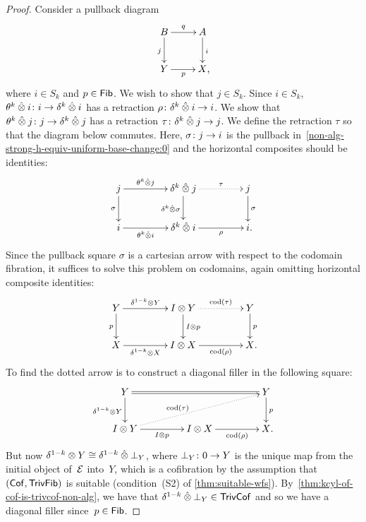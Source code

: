 \documentclass[reqno,10pt,a4paper,oneside,draft]{amsart}
\begin{document}
{{\begin{proof}
Consider a pullback diagram
\begin{equation} \label{non-alg-strong-h-equiv-uniform-base-change:0}
\begin{gathered}
\xymatrix{
 B \ar[d]_j \ar[r]^q & A \ar[d]^i \\
Y \ar[r]_p & X \rlap{,}}
\end{gathered}
\end{equation}
where $i  \in S_k$ and $p \in \mathsf{Fib}$.
We wish to show that $j \in  S_k$.
Since $i \in S_k$, $\theta^k \mathbin{\hat{\otimes}} i \colon i \to \delta^k \mathbin{\hat{\otimes}} i$ has a retraction $\rho \colon \delta^k \mathbin{\hat{\otimes}} i \to i$.
We show that $\theta^k \mathbin{\hat{\otimes}} j \colon j \to \delta^k \mathbin{\hat{\otimes}} j$ has a retraction $\tau \colon  \delta^k \mathbin{\hat{\otimes}} j \to j$.
We define the retraction $\tau$ so that the diagram below commutes.
Here, $\sigma \colon j \to i$ is the pullback in~\eqref{non-alg-strong-h-equiv-uniform-base-change:0} and the horizontal composites should be identities:
\[
\xymatrix@C+2em{
j
  \ar[r]^-{\thetak \hatotimes j}
  \ar[d]_{\sigma}
&
  \kcyl \hatotimes j
  \ar@{.>}[r]^-{\tau}
  \ar[d]_{\kcyl \hatotimes \sigma}
&
 j
  \ar[d]^{\sigma}
\\
  i
  \ar[r]_-{\thetak \hatotimes i}
&
  \kcyl \hatotimes i
  \ar[r]_-{\rho}
&
  i
\rlap{.}}
\]
Since the pullback square $\sigma$ is a cartesian arrow with respect to the codomain fibration, it suffices to solve this problem on codomains, again omitting horizontal composite identities:
\[
\xymatrix@C+2em{
  Y
  \ar[r]^-{\kcylinv \otimes Y}
  \ar[d]_{p}
&
  \interval \otimes Y
  \ar@{.>}[r]^-{\cod(\tau)}
  \ar[d]^{\interval \otimes p}
&
  Y
  \ar[d]^{p}
\\
  X
  \ar[r]_-{\kcylinv \otimes X}
&
  \interval \otimes X
  \ar[r]_-{\cod(\rho)}
&
  X
\rlap{.}}
\]
To find the dotted arrow is to construct a diagonal filler in the following square:
\[
\xymatrix@C+2em{
  Y
  \ar@{=}[rr]
  \ar[d]_{\kcylinv \otimes Y}
&&
  Y
  \ar[d]^{p}
\\
  \interval \otimes Y
  \ar[r]_-{I \otimes p}
  \ar@{.>}[urr]^(0.4){\cod(\tau)}
&
  \interval \otimes X
  \ar[r]_-{\cod(\rho)}
&
  X
\rlap{.}}
\]
But now $\delta^{1-k} \otimes Y \cong \delta^{1-k} \mathbin{\hat{\otimes}} \bot_Y$, where $\bot_Y \colon 0 \to Y$ is the unique map from the initial object of~$\mathcal{E}$ into~$Y$, which is a cofibration by the assumption that $(\mathsf{Cof}, \mathsf{TrivFib})$ is suitable (condition~(S2) of \cref{thm:suitable-wfs}). By~\cref{thm:kcyl-of-cof-is-trivcof-non-alg}, we have that $\delta^{1-k} \mathbin{\hat{\otimes}} \bot_Y \in \mathsf{TrivCof}$ and
so we have a diagonal filler since~$p \in \mathsf{Fib}$.
\end{proof}

}}
\end{document}
